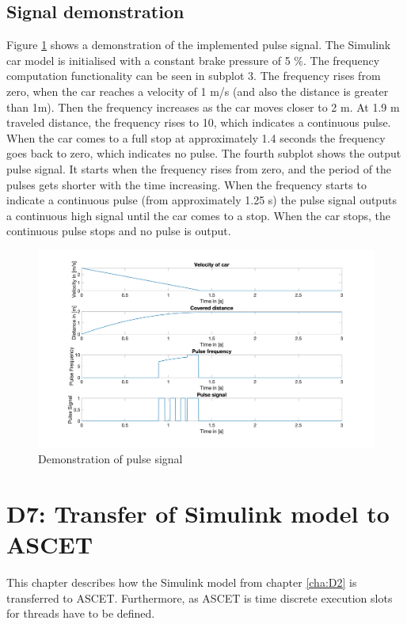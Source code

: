 \section{Signal demonstration}\label{sec:D6_SignalDemonstration}
Figure \ref{fig:D6_Result} shows a demonstration of the implemented pulse signal. The Simulink car model is initialised with a constant brake pressure of 5 \%. The frequency computation functionality can be seen in subplot 3. The frequency rises from zero, when the car reaches a velocity of 1 m/s (and also the distance is greater than 1m). Then the frequency increases as the car moves closer to 2 m. At 1.9 m traveled distance, the frequency rises to 10, which indicates a continuous pulse. When the car comes to a full stop at approximately 1.4 seconds the frequency goes back to zero, which indicates no pulse. The fourth subplot shows the output pulse signal. It starts when the frequency rises from zero, and the period of the pulses gets shorter with the time increasing. When the frequency starts to indicate a continuous pulse (from approximately 1.25 s) the pulse signal outputs a continuous high signal until the car comes to a stop. When the car stops, the continuous pulse stops and no pulse is output.

\begin{figure}[H]
\centering
\includegraphics[width=1\textwidth]{images/D6_result.jpg}
\caption{Demonstration of pulse signal}
\label{fig:D6_Result}
\end{figure}

\chapter{D7: Transfer of Simulink model to ASCET}\label{cha:D7}

This chapter describes how the Simulink model from chapter \ref{cha:D2} is transferred to ASCET. %
Furthermore, as ASCET is time discrete execution slots for threads have to be defined.

